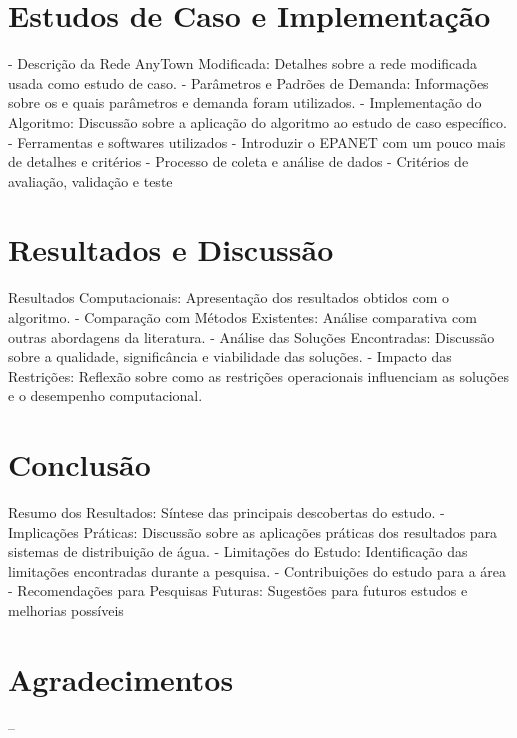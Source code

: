 \documentclass[12pt,a4paper,oneside,linenumbers=off,latinmodern=off,timesnews=off,english,spanish]{rctart-class/rctart}
\begin{document}


\section{Estudos de Caso e Implementação}

- Descrição da Rede AnyTown Modificada: Detalhes sobre a rede modificada usada como estudo de caso.
- Parâmetros e Padrões de Demanda: Informações sobre os e quais parâmetros e demanda foram utilizados.
- Implementação do Algoritmo: Discussão sobre a aplicação do algoritmo ao estudo de caso específico.
- Ferramentas e softwares utilizados
- Introduzir o EPANET com um pouco mais de detalhes e critérios
- Processo de coleta e análise de dados
- Critérios de avaliação, validação e teste

\section{Resultados e Discussão}

Resultados Computacionais: Apresentação dos resultados obtidos com o algoritmo.
- Comparação com Métodos Existentes: Análise comparativa com outras abordagens da
literatura.
- Análise das Soluções Encontradas: Discussão sobre a qualidade, significância e viabilidade das soluções.
- Impacto das Restrições: Reflexão sobre como as restrições operacionais influenciam as soluções e o desempenho computacional.

\section{Conclusão}

Resumo dos Resultados: Síntese das principais descobertas do estudo.
- Implicações Práticas: Discussão sobre as aplicações práticas dos resultados para sistemas
de distribuição de água.
- Limitações do Estudo: Identificação das limitações encontradas durante a pesquisa.
- Contribuições do estudo para a área
- Recomendações para Pesquisas Futuras: Sugestões para futuros estudos e melhorias possíveis

\section{Agradecimentos}

--


\end{document}
